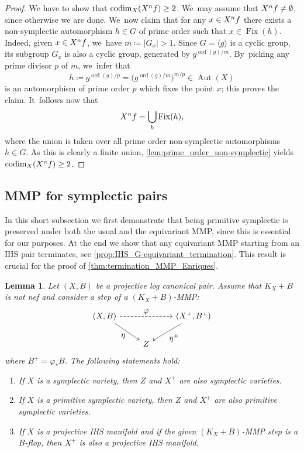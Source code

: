 \documentclass[10pt]{amsart}
\let\ts\textstyle
\theoremstyle{plain}
\newtheorem{lem}[thm]{Lemma}
\theoremstyle{definition}
\DeclareMathOperator{\codim}{codim}
\DeclareMathOperator{\Aut}{Aut}
\DeclareMathOperator{\Fix}{Fix}
\DeclareMathOperator{\ord}{ord}
\begin{document}
\begin{proof}
We have to show that $\codim_X (X^\textup{nf}) \geq 2$. We~may assume that $X^\textup{nf} \neq \emptyset$, since otherwise we are done. We~now claim that for any $x \in X^\textup{nf}$ there exists a non-symplectic automorphism $h \in G$ of prime order such that $x \in \Fix(h)$. Indeed, given $x \in X^\textup{nf}$, we~have $m \coloneqq |G_x| >1$. Since $G = \langle g \rangle$ is a cyclic group, its subgroup $G_x$ is also a cyclic group, generated by $g^{\ord(g)/m}$. By~picking any prime divisor $p$ of $m$, we~infer that
\[
h \coloneqq g^{\ord(g) / p} = \bigl(g^{\ord(g) / m}\bigr)^{m/p} \in \Aut(X)
\]
is an automorphism of prime order $p$ which fixes the point $x$; this proves the claim. It~follows now that
\[
X^\textup{nf} = \bigcup_h \Fix(h),
\]
where the union is taken over all prime order non-symplectic automorphisms $h \in G$. As this is clearly a finite union, \autoref{lem:prime_order_non-symplectic} yields $\codim_X (X^\textup{nf}) \geq 2$.
\end{proof}

\subsection{MMP for symplectic pairs}
\label{subsection:MMP_symplectic}

In this short subsection we first demonstrate that being primitive symplectic is preserved under both the usual and the equivariant MMP, since this is essential for our purposes. At the end we show that any equivariant MMP starting from an IHS pair terminates, see \autoref{prop:IHS_G-equivariant_termination}. This result is crucial for the proof of \autoref{thm:termination_MMP_Enriques}.

\begin{lem}
\label{lem:MMP_step_symplectic}
Let $(X,B)$ be a projective log canonical pair. Assume that $K_X + B$ is not nef and consider a step of a $(K_X+B)$-MMP:
\[
\begin{tikzcd}
(X, B) \arrow[dr, "\ts \eta" swap] \arrow[rr, "\ts \varphi", dashed] && (X^+, B^+) \arrow[dl, "\ts \eta^+"] \\
& Z
\end{tikzcd}
\]
where $B^+ = \varphi_* B$. The following statements hold:
\begin{enumerate}
\item\label{lem:MMP_step_symplectici}
If $X$ is a symplectic variety, then $Z$ and $X^+$ are also symplectic varieties.

\item\label{lem:MMP_step_symplecticii}
If $X$ is a primitive symplectic variety, then $Z$ and $X^+$ are also primitive symplectic varieties.

\item\label{lem:MMP_step_symplecticiii}
If $X$ is a projective IHS manifold and if the given $(K_X+B)$-MMP step is a $B$-flop, then $X^+$ is also a projective IHS manifold.
\end{enumerate}
\end{lem}
\end{document}
